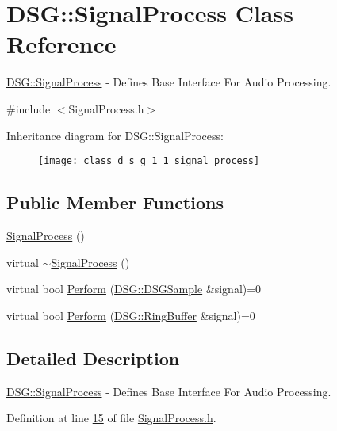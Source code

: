 \hypertarget{class_d_s_g_1_1_signal_process}{\section{D\+S\+G\+:\+:Signal\+Process Class Reference}
\label{class_d_s_g_1_1_signal_process}
}


\hyperlink{class_d_s_g_1_1_signal_process}{D\+S\+G\+::\+Signal\+Process} -\/ Defines Base Interface For Audio Processing.  




{\ttfamily \#include $<$Signal\+Process.\+h$>$}

Inheritance diagram for D\+S\+G\+:\+:Signal\+Process\+:\begin{figure}[H]
\begin{center}
\leavevmode
\texttt{[image: class\_d\_s\_g\_1\_1\_signal\_process]}
\end{center}
\end{figure}
\subsection*{Public Member Functions}
\begin{DoxyCompactItemize}
\item 
\hyperlink{class_d_s_g_1_1_signal_process_a3fd4347483bcf3cc0a3d7bf98ff56218}{Signal\+Process} ()
\item 
virtual \hyperlink{class_d_s_g_1_1_signal_process_ad9b6a758241a092ddc38e13effc9553f}{$\sim$\+Signal\+Process} ()
\item 
virtual bool \hyperlink{class_d_s_g_1_1_signal_process_af73d246c460915db7a9be7e3ef36844d}{Perform} (\hyperlink{namespace_d_s_g_ac39a94cd27ebcd9c1e7502d0c624894a}{D\+S\+G\+::\+D\+S\+G\+Sample} \&signal)=0
\item 
virtual bool \hyperlink{class_d_s_g_1_1_signal_process_a2c8ff3487d9c43f9eace1d9192d4a37e}{Perform} (\hyperlink{class_d_s_g_1_1_ring_buffer}{D\+S\+G\+::\+Ring\+Buffer} \&signal)=0
\end{DoxyCompactItemize}


\subsection{Detailed Description}
\hyperlink{class_d_s_g_1_1_signal_process}{D\+S\+G\+::\+Signal\+Process} -\/ Defines Base Interface For Audio Processing. 

Definition at line \hyperlink{_signal_process_8h_source_l00015}{15} of file \hyperlink{_signal_process_8h_source}{Signal\+Process.\+h}.



